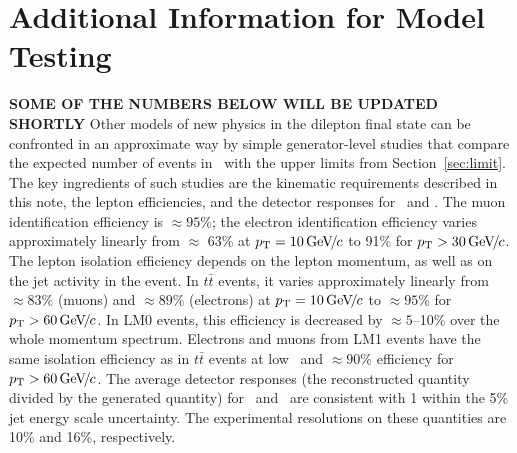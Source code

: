 \section{Additional Information for Model Testing}
\label{sec:outreach}
{\bf SOME OF THE NUMBERS BELOW WILL BE UPDATED SHORTLY}
Other models of new physics in the dilepton final state can be confronted in an approximate way by simple 
generator-level studies that compare the expected number of events in \lumifinal\
with the upper limits from Section~\ref{sec:limit}.
The key ingredients of such studies are the kinematic requirements described 
in this note, the lepton efficiencies, and the detector responses for \HT\ and \MET.
%
The muon identification efficiency is $\approx 95\%$;
the electron identification efficiency varies approximately linearly from $\approx$ 63\% at 
$p_{\mathrm{T}} = 10{\,\text{Ge\hspace{-.08em}V\hspace{-0.16em}/\hspace{-0.08em}}c}$ to 91\% for $p_{\mathrm{T}} > 30{\,\text{Ge\hspace{-.08em}V\hspace{-0.16em}/\hspace{-0.08em}}c}$.  
%
The lepton isolation efficiency depends on the lepton momentum, as well as on the jet activity in the 
event.
In $t\bar{t}$ events, it varies approximately linearly from $\approx 83\%$ (muons)
and $\approx 89\%$ (electrons) at $p_{\mathrm{T}}=10{\,\text{Ge\hspace{-.08em}V\hspace{-0.16em}/\hspace{-0.08em}}c}$ to $\approx 95\%$ for $p_{\mathrm{T}}>60{\,\text{Ge\hspace{-.08em}V\hspace{-0.16em}/\hspace{-0.08em}}c}$. 
In LM0 events, this efficiency is decreased by $\approx 5$--10\% over the whole momentum spectrum.
Electrons and muons from LM1 events have the same isolation efficiency as in $t\bar{t}$ events
at low \pt\ and $\approx 90$\% efficiency for $p_{\mathrm{T}}>60{\,\text{Ge\hspace{-.08em}V\hspace{-0.16em}/\hspace{-0.08em}}c}$.  
%
The average detector responses (the reconstructed quantity divided by the generated quantity) 
for \HT\ and \MET\ are consistent with 1 within the 5\% jet energy scale uncertainty.
The experimental resolutions on these quantities are 10\% and 16\%, respectively.



